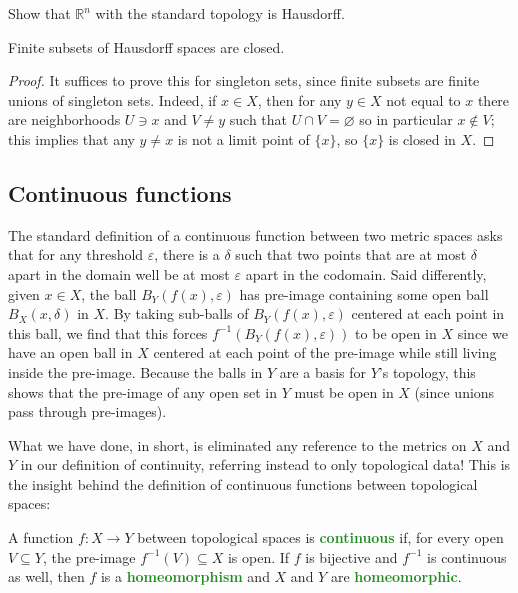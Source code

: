 \documentclass[11pt]{scrartcl}
\providecommand{\eps}{\varepsilon}
\providecommand{\RR}{\mathbb R}
\providecommand{\inv}{^{-1}}
\providecommand{\vocab}[1]{{\textbf{\textcolor{ForestGreen}{#1}}}}
\begin{document}
\begin{exercise}
    Show that $\RR^n$ with the standard topology is Hausdorff.
\end{exercise}

\begin{prop}
    \label{prop:finite-subset-of-hausdorff-closed}
    Finite subsets of Hausdorff spaces are closed.
\end{prop}

\begin{proof}
    It suffices to prove this for singleton sets,
    since finite subsets are finite unions of singleton sets.
    Indeed, if $x\in X$, then for any $y\in X$ not equal to $x$
    there are neighborhoods $U\ni x$ and $V\ne y$
    such that $U\cap V=\varnothing$ so in particular $x\notin V$;
    this implies that any $y\ne x$ is not a limit point of $\{x\}$,
    so $\{x\}$ is closed in $X$.
\end{proof}

\subsection{Continuous functions}
The standard definition of a continuous function between two metric spaces
asks that for any threshold $\eps$, there is a $\delta$ such that
two points that are at most $\delta$ apart in the domain
well be at most $\eps$ apart in the codomain.
Said differently, given $x\in X$, the ball $B_Y(f(x),\eps)$
has pre-image containing some open ball $B_X(x,\delta)$ in $X$.
By taking sub-balls of $B_Y(f(x),\eps)$ centered at each point in this ball,
we find that this forces $f\inv(B_Y(f(x),\eps))$ to be open in $X$
since we have an open ball in $X$ centered at each point of the pre-image
while still living inside the pre-image.
Because the balls in $Y$ are a basis for $Y$'s topology,
this shows that the pre-image of any open set in $Y$
must be open in $X$ (since unions pass through pre-images).

What we have done, in short, is eliminated any reference to
the metrics on $X$ and $Y$ in our definition of continuity,
referring instead to only topological data! This is the insight behind
the definition of continuous functions between topological spaces:
\begin{definition}
    \label{def:continuity-homeomorphism}
    A function $f\colon X\to Y$ between topological spaces
    is \vocab{continuous} if, for every open $V\subseteq Y$,
    the pre-image $f\inv(V)\subseteq X$ is open.
    If $f$ is bijective and $f\inv$ is continuous as well,
    then $f$ is a \vocab{homeomorphism} and
    $X$ and $Y$ are \vocab{homeomorphic}.
\end{definition}
\end{document}
